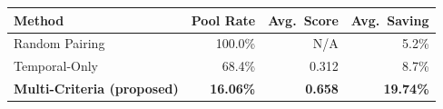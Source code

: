 \begin{tabularx}{\columnwidth}{>{\raggedright\arraybackslash}X r r r}
\toprule
\textbf{Method} & \textbf{Pool Rate} & \textbf{Avg.\ Score} & \textbf{Avg.\ Saving} \\
\midrule
Random Pairing & 100.0\% & N/A & 5.2\% \\
Temporal-Only & 68.4\% & 0.312 & 8.7\% \\
\textbf{Multi-Criteria (proposed)} & \textbf{16.06\%} & \textbf{0.658} & \textbf{19.74\%} \\
\bottomrule
\end{tabularx}
